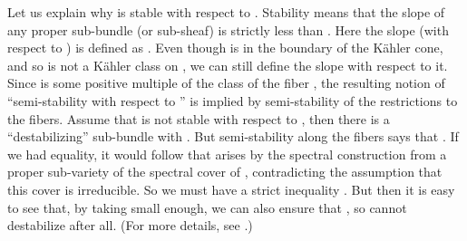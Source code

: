 \documentclass[a4paper,12pt]{article}
\numberwithin{equation}{section}
\theoremstyle{plain}
\begin{document}
Let us explain why \coordHE{} is stable with respect to \myHighlight{$\omega$}\coordHE{}. Stability
means that the slope \coordHE{} of any proper sub-bundle (or sub-sheaf) 
\coordHE{} is strictly less than \coordHE{}. Here the slope (with
respect to \myHighlight{$\omega$}\coordHE{}) is defined as 
\coordHE{}.
Even though \coordHE{} is in the boundary of the K\"{a}hler cone, and so
is not a K\"{a}hler class on \coordHE{}, we can still define the slope 
\coordHE{} 
with respect to it. Since \coordHE{}
is some positive multiple of the class of the fiber \coordHE{}, the resulting notion
of ``semi-stability with respect to \coordHE{}'' is implied by
semi-stability of the restrictions \coordHE{} to the fibers.
Assume that \coordHE{} is not stable with respect to \myHighlight{$\omega$}\coordHE{}, then there is a
``destabilizing'' sub-bundle \coordHE{} with \coordHE{}.
But semi-stability along the fibers says that \coordHE{}. If we had equality, it would follow that \coordHE{}
arises by the spectral construction from a proper sub-variety of the
spectral cover of \coordHE{}, contradicting the assumption that this cover is
irreducible. So we must have a strict inequality \coordHE{}.
But then it is easy to see that, by taking \myHighlight{$\epsilon$}\coordHE{} small enough, we can
also ensure that \coordHE{}, so \coordHE{} cannot destabilize \coordHE{}
after all. (For more details, see \cite{FMW2}.)
\end{document}
